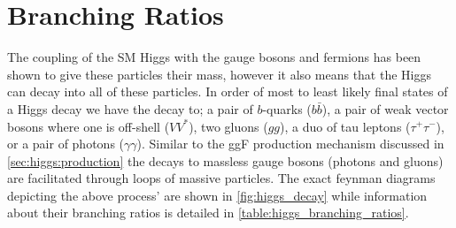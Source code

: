 \section{Branching Ratios} \label{sec:higgs:branching}

The coupling of the SM Higgs with the gauge bosons and fermions has been shown
to give these particles their mass, however it also means that the Higgs can
decay into all of these particles.  In order of most to least likely final
states of a Higgs decay we have the decay to; a pair of $b$-quarks ($b\bar{b}$),
a pair of weak vector bosons where one is off-shell ($VV^{*}$), two gluons
($gg$), a duo of tau leptons ($\tau^{+}\tau^{-}$), or a pair of photons
($\gamma\gamma$).  Similar to the ggF production mechanism discussed in
\cref{sec:higgs:production} the decays to massless gauge bosons (photons and
gluons) are facilitated through loops of massive particles. The exact feynman
diagrams depicting the above process' are shown in \cref{fig:higgs_decay} while
information about their branching ratios is detailed in
\cref{table:higgs_branching_ratios}.

